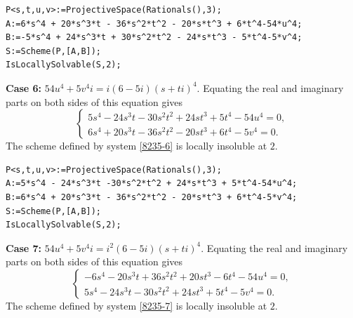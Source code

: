 \documentclass[a4paper,12pt,english,reqno]{amsart}
\begin{document}
\begin{lstlisting}
P<s,t,u,v>:=ProjectiveSpace(Rationals(),3);
A:=6*s^4 + 20*s^3*t - 36*s^2*t^2 - 20*s*t^3 + 6*t^4-54*u^4;
B:=-5*s^4 + 24*s^3*t + 30*s^2*t^2 - 24*s*t^3 - 5*t^4-5*v^4;
S:=Scheme(P,[A,B]);
IsLocallySolvable(S,2);
\end{lstlisting}

{\bf Case 6:} $54u^4+5v^4i=i(6-5i)(s+ti)^4$. Equating the real and imaginary parts on both sides of this equation gives
\begin{equation}\label{8235-6}
\begin{cases}
5s^4 - 24s^3t - 30s^2t^2 + 24st^3 + 5t^4 - 54u^4=0, \\
6s^4 + 20s^3t - 36s^2t^2 - 20st^3 + 6t^4 - 5v^4=0.
\end{cases}
\end{equation}
The scheme defined by system \eqref{8235-6} is locally insoluble at $2$.


\begin{lstlisting}
P<s,t,u,v>:=ProjectiveSpace(Rationals(),3);
A:=5*s^4 - 24*s^3*t -30*s^2*t^2 + 24*s*t^3 + 5*t^4-54*u^4;
B:=6*s^4 + 20*s^3*t - 36*s^2*t^2 - 20*s*t^3 + 6*t^4-5*v^4;
S:=Scheme(P,[A,B]);
IsLocallySolvable(S,2);
\end{lstlisting}

{\bf Case 7:} $54u^4+5v^4i=i^2(6-5i)(s+ti)^4$. Equating the real and imaginary parts on both sides of this equation gives
\begin{equation}\label{8235-7}
\begin{cases}
-6s^4 - 20s^3t + 36s^2t^2 + 20st^3 - 6t^4 - 54u^4=0, \\
5s^4 - 24s^3t - 30s^2t^2 + 24st^3 + 5t^4 - 5v^4=0.
\end{cases}
\end{equation}
The scheme defined by system \eqref{8235-7} is locally insoluble at $2$.

\end{document}
